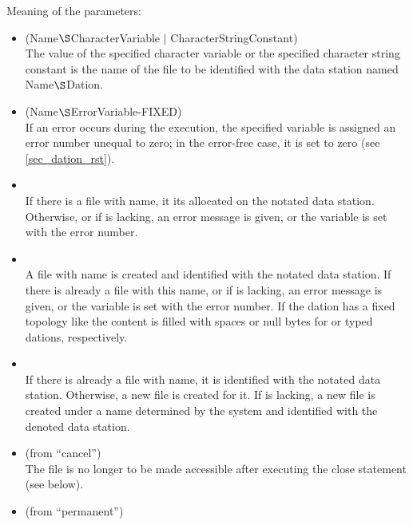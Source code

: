 
Meaning of the parameters:
\begin{itemize}
\item {} (Name$\S $CharacterVariable $\mid$ CharacterStringConstant)
\\
The value of the specified character variable or the specified character
string constant is the name of the file to be identified with the data
station named Name$\S $Dation.
\item {} (Name$\S $ErrorVariable-FIXED)
\\
If an error occurs during the  execution, the specified variable is
assigned an error number unequal to zero; in the error-free case, it is
set to zero (see \ref{sec_dation_rst}).
\item {}\\
If there is a file with  name, it its allocated on the notated data
station. Otherwise, or if  is lacking, an error message is given, or
the  variable is set with the error number.
\item {}\\
A file with  name is created and identified with the notated data
station. If there is already a file with this name, or if  is
lacking, an error message is given, or the  variable is set with the
error number.
If the dation has a fixed topology like  the content is
filled with spaces or null bytes for  or typed dations, respectively.
\item {}\\
If there is already a file with  name, it is identified with the
notated data station. Otherwise, a new file is created for it. If 
is lacking, a new file is created under a name determined by the system
and identified with the denoted data station.
\item {} (from ``cancel'')\\
The file is no longer to be made accessible after executing the close
statement (see below).
\item {} (from ``permanent'')\\

\end{itemize}
